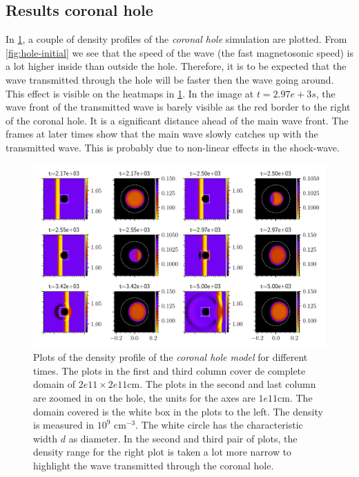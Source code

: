 \subsection{Results coronal hole}

In \cref{fig:hole-frames}, a couple of density profiles of the \emph{coronal hole} simulation are plotted.
From \cref{fig:hole-initial} we see that the speed of the wave (the fast magnetosonic speed) is a lot higher inside than outside the hole.
Therefore, it is to be expected that the wave transmitted through the hole will be faster then the wave going around.
This effect is visible on the heatmaps in \cref{fig:hole-frames}. 
In the image at $t=2.97e+3s$, the wave front of the transmitted wave is barely visible as the red border to the right of the coronal hole. It is a significant distance ahead of the main wave front.
The frames at later times show that the main wave slowly catches up with the transmitted wave. This is probably due to non-linear effects in the shock-wave.

\begin{figure}[H]
	\centering
	\includegraphics[width=\linewidth]{images/hole-frames.pdf}
	\caption{Plots of the density profile of the \emph{coronal hole model} for different times. 
	The plots in the first and third column cover de complete domain of $2e11\times2e11$cm.
	The plots in the second and last column are zoomed in on the hole, the units for the axes are $1e11$cm. 
	The domain covered is the white box in the plots to the left.
 The density is measured in $10^{9}$ cm$^{-3}$.
The white circle has the characteristic width $d$ as diameter. 
In the second and third pair of plots, the density range for the right plot is taken a lot more narrow to highlight the wave transmitted through the coronal hole. }
	\label{fig:hole-frames}
\end{figure}


